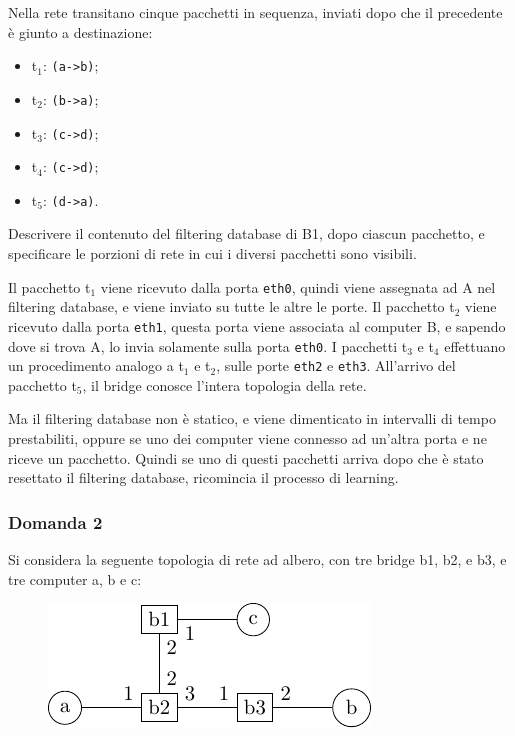 \documentclass{article}
\numberwithin{equation}{subsection}
\begin{document}
Nella rete transitano 
cinque pacchetti in sequenza, inviati dopo che il precedente è giunto a destinazione: 
\begin{itemize}
    \item t$_1$: \verb|(a->b)|;
    \item t$_2$: \verb|(b->a)|;
    \item t$_3$: \verb|(c->d)|;
    \item t$_4$: \verb|(c->d)|;
    \item t$_5$: \verb|(d->a)|. 
\end{itemize}

Descrivere il contenuto del filtering database di B1, dopo ciascun pacchetto, e specificare le porzioni di rete in cui i diversi pacchetti sono visibili. 

Il pacchetto t$_1$ viene ricevuto dalla porta \verb|eth0|, quindi viene assegnata ad A nel filtering database, e viene inviato su tutte le altre le porte. 
Il pacchetto t$_2$ viene ricevuto dalla porta \verb|eth1|, questa porta viene associata al computer B, e sapendo dove si trova A, lo invia solamente sulla porta \verb|eth0|.
I pacchetti t$_3$ e t$_4$ effettuano un procedimento analogo a t$_1$ e t$_2$, sulle porte \verb|eth2| e \verb|eth3|. 
All'arrivo del pacchetto t$_5$, il bridge conosce l'intera topologia della rete. 

Ma il filtering database non è statico, e viene dimenticato in intervalli di tempo prestabiliti, oppure se uno dei computer viene connesso ad un'altra porta 
e ne riceve un pacchetto. Quindi se uno di questi pacchetti arriva dopo che è stato resettato il filtering database, ricomincia il processo di learning. 

\subsubsection*{Domanda 2}

Si considera la seguente topologia di rete ad albero, con tre bridge b1, b2, e b3, e tre computer a, b e c: 
\begin{figure}[H]%
    \centering%
    \includegraphics{albero_bridge.pdf}%
\end{figure}
\end{document}
